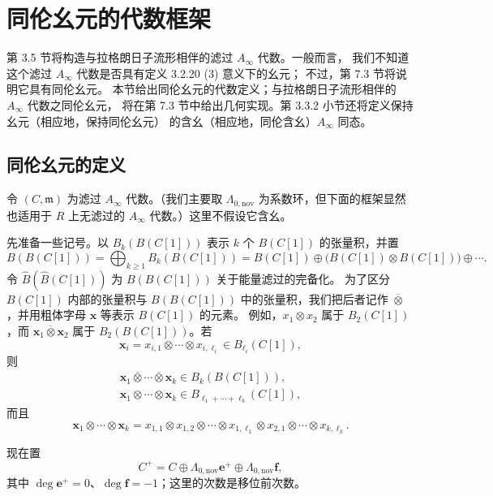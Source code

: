 
\section{同伦幺元的代数框架}
\label{sec:3-3}

第 3.5 节将构造与拉格朗日子流形相伴的滤过 $A_\infty$ 代数。一般而言，
我们不知道这个滤过 $A_\infty$ 代数是否具有定义 3.2.20 (3) 意义下的幺元；
不过，第 7.3 节将说明它具有同伦幺元。
本节给出同伦幺元的代数定义；与拉格朗日子流形相伴的 $A_\infty$ 代数之同伦幺元，
将在第 7.3 节中给出几何实现。第 3.3.2 小节还将定义保持幺元（相应地，保持同伦幺元）
的含幺（相应地，同伦含幺）$A_\infty$ 同态。

\subsection{同伦幺元的定义}
\label{subsec:3-3-1}

令 $(C,\mathfrak m)$ 为滤过 $A_\infty$ 代数。（我们主要取
$\Lambda_{0,\mathrm{nov}}$ 为系数环，但下面的框架显然也适用于 $R$ 上无滤过的
$A_\infty$ 代数。）这里不假设它含幺。

先准备一些记号。以 $B_k(B(C[1]))$ 表示 $k$ 个 $B(C[1])$ 的张量积，并置
\[
  B(B(C[1]))
  =\bigoplus_{k\geq1}B_k(B(C[1]))
  =B(C[1])\oplus
  \bigl(B(C[1])\otimes B(C[1])\bigr)\oplus\cdots .
\]
令 $\widehat B(\widehat B(C[1]))$ 为 $B(B(C[1]))$ 关于能量滤过的完备化。
为了区分 $B(C[1])$ 内部的张量积与 $B(B(C[1]))$ 中的张量积，我们把后者记作
$\mathbin{\overline\otimes}$，并用粗体字母 $\mathbf x$ 等表示 $B(C[1])$ 的元素。
例如，$x_1\otimes x_2$ 属于 $B_2(C[1])$，而
$\mathbf x_1\mathbin{\overline\otimes}\mathbf x_2$ 属于
$B_2(B(C[1]))$。若
\[
  \mathbf x_i=x_{i,1}\otimes\cdots\otimes x_{i,\ell_i}
  \in B_{\ell_i}(C[1]),
\]
则
\[
\begin{gathered}
  \mathbf x_1\mathbin{\overline\otimes}\cdots
  \mathbin{\overline\otimes}\mathbf x_k\in B_k(B(C[1])),\\
  \mathbf x_1\otimes\cdots\otimes\mathbf x_k
  \in B_{\ell_1+\cdots+\ell_k}(C[1]),
\end{gathered}
\]
而且
\[
  \mathbf x_1\otimes\cdots\otimes\mathbf x_k
  =x_{1,1}\otimes x_{1,2}\otimes\cdots\otimes x_{1,\ell_1}
  \otimes x_{2,1}\otimes\cdots\otimes x_{k,\ell_k}.
\]

现在置
\begin{equation}
  C^+=C\oplus\Lambda_{0,\mathrm{nov}}\mathbf e^+
  \oplus\Lambda_{0,\mathrm{nov}}\mathbf f,
  \tag{3.3.1}\label{eq:3-3-1}
\end{equation}
其中 $\deg\mathbf e^+=0$、$\deg\mathbf f=-1$；这里的次数是移位前次数。

